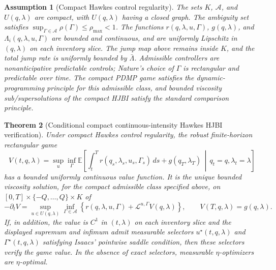 \documentclass[11pt]{article}
\newtheorem{assumption}{Assumption}
\newtheorem{theorem}[assumption]{Theorem}
\newcommand{\E}{\mathbb{E}}
\begin{document}
\begin{assumption}[Compact Hawkes control regularity]
The sets $K$, $\mathcal A$, and $U(q,\lambda)$ are compact, with
$U(q,\lambda)$ having a closed graph. The ambiguity set satisfies
$\sup_{\Gamma\in\mathcal A}\rho(\Gamma)\le\rho_{\max}<1$. The functions
$r(q,\lambda,u,\Gamma)$, $g(q,\lambda)$, and
$\Lambda_i(q,\lambda,u,\Gamma)$ are bounded and continuous, and are uniformly
Lipschitz in $(q,\lambda)$ on each inventory slice. The jump map above remains
inside $K$, and the total jump rate is uniformly bounded by $\bar\Lambda$.
Admissible controllers are nonanticipative predictable controls; Nature's
choice of $\Gamma$ is rectangular and predictable over time. The compact PDMP
game satisfies the dynamic-programming principle for this admissible class, and
bounded viscosity sub/supersolutions of the compact HJBI satisfy the standard
comparison principle.
\end{assumption}

\begin{theorem}[Conditional compact continuous-intensity Hawkes HJBI verification]
Under compact Hawkes control regularity, the robust finite-horizon rectangular
game
\[
V(t,q,\lambda)=
\sup_u\inf_\Gamma
\E\left[
\int_t^T r(q_s,\lambda_s,u_s,\Gamma_s)\,ds+
g(q_T,\lambda_T)
\,\middle|\,q_t=q,\lambda_t=\lambda
\right]
\]
has a bounded uniformly continuous value function. It is the unique bounded
viscosity solution, for the compact admissible class specified above, on
$[0,T]\times\{-Q,\ldots,Q\}\times K$ of
\[
-\partial_t V=
\sup_{u\in U(q,\lambda)}\inf_{\Gamma\in\mathcal A}
\left\{
r(q,\lambda,u,\Gamma)+
\mathcal L^{u,\Gamma}V(q,\lambda)
\right\},
\qquad
V(T,q,\lambda)=g(q,\lambda).
\]
If, in addition, the value is $C^1$ in $(t,\lambda)$ on each inventory slice
and the displayed supremum and infimum admit measurable selectors
$u^\star(t,q,\lambda)$ and $\Gamma^\star(t,q,\lambda)$ satisfying Isaacs'
pointwise saddle condition, then these selectors verify the game value. In the
absence of exact selectors, measurable $\eta$-optimizers are $\eta$-optimal.
\end{theorem}
\end{document}
